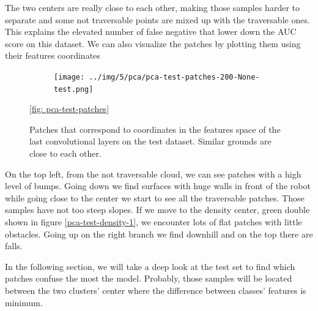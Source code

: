 \documentclass[../document.tex]{subfiles}
\begin{document}
The two centers are really close to each other, making those samples harder to separate and some not traversable points are mixed up with the traversable ones. This explains the elevated number of false negative that lower down the AUC score on this dataset. We can also visualize the patches by plotting them using their features coordinates
\begin{figure} [htbp]
    \centering
    \begin{subfigure}[b]{1\textwidth}
        \texttt{[image: ../img/5/pca/pca-test-patches-200-None-test.png]}
    \end{subfigure}
\caption{Patches that correspond to coordinates in the features space of the last convolutional layers on the test dataset. Similar grounds are close to each other.}
\ref{fig: pca-test-patches}
\end{figure}
On the top left, from the not traversable cloud, we can see patches with a high level of bumps. Going down we find surfaces with huge walls in front of the robot while going close to the center we start to see all the traversable patches. Those samples have not too steep slopes. If we move to the density center, green double shown in figure \ref{pca-test-density-1}, we encounter lots of flat patches with little obstacles. Going up on the right branch we find downhill and on the top there are falls. 

In the following section, we will take a deep look at the test set to find which patches confuse the most the model. Probably, those samples will be located between the two clusters' center where the difference between classes' features is minimum. 



%
\end{document}
